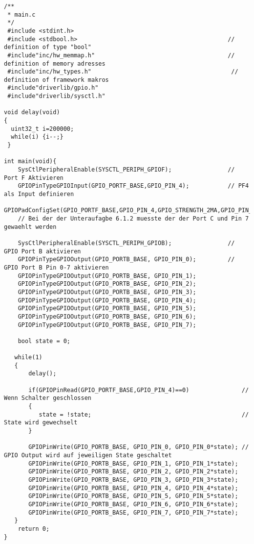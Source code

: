 \subsubsection{}

\begin{lstlisting}
/**
 * main.c
 */
 #include <stdint.h>
 #include <stdbool.h>                                           // definition of type "bool"
 #include"inc/hw_memmap.h"                                      // definition of memory adresses
 #include"inc/hw_types.h"                                        // definition of framework makros
 #include"driverlib/gpio.h"
 #include"driverlib/sysctl.h"

void delay(void)
{
  uint32_t i=200000;
  while(i) {i--;}
 }

int main(void){
    SysCtlPeripheralEnable(SYSCTL_PERIPH_GPIOF);                // Port F Aktivieren
    GPIOPinTypeGPIOInput(GPIO_PORTF_BASE,GPIO_PIN_4);           // PF4 als Input definieren
    GPIOPadConfigSet(GPIO_PORTF_BASE,GPIO_PIN_4,GPIO_STRENGTH_2MA,GPIO_PIN_TYPE_STD_WPU);
    // Bei der der Unteraufagbe 6.1.2 muesste der der Port C und Pin 7 gewaehlt werden

    SysCtlPeripheralEnable(SYSCTL_PERIPH_GPIOB);                // GPIO Port B aktivieren
    GPIOPinTypeGPIOOutput(GPIO_PORTB_BASE, GPIO_PIN_0);         // GPIO Port B Pin 0-7 aktivieren
    GPIOPinTypeGPIOOutput(GPIO_PORTB_BASE, GPIO_PIN_1);
    GPIOPinTypeGPIOOutput(GPIO_PORTB_BASE, GPIO_PIN_2);
    GPIOPinTypeGPIOOutput(GPIO_PORTB_BASE, GPIO_PIN_3);
    GPIOPinTypeGPIOOutput(GPIO_PORTB_BASE, GPIO_PIN_4);
    GPIOPinTypeGPIOOutput(GPIO_PORTB_BASE, GPIO_PIN_5);
    GPIOPinTypeGPIOOutput(GPIO_PORTB_BASE, GPIO_PIN_6);
    GPIOPinTypeGPIOOutput(GPIO_PORTB_BASE, GPIO_PIN_7);

    bool state = 0;

   while(1)
   {
       delay();

       if(GPIOPinRead(GPIO_PORTF_BASE,GPIO_PIN_4)==0)               // Wenn Schalter geschlossen
       {
          state = !state;                                           // State wird gewechselt
       }

       GPIOPinWrite(GPIO_PORTB_BASE, GPIO_PIN_0, GPIO_PIN_0*state); // GPIO Output wird auf jeweiligen State geschaltet
       GPIOPinWrite(GPIO_PORTB_BASE, GPIO_PIN_1, GPIO_PIN_1*state);
       GPIOPinWrite(GPIO_PORTB_BASE, GPIO_PIN_2, GPIO_PIN_2*state);
       GPIOPinWrite(GPIO_PORTB_BASE, GPIO_PIN_3, GPIO_PIN_3*state);
       GPIOPinWrite(GPIO_PORTB_BASE, GPIO_PIN_4, GPIO_PIN_4*state);
       GPIOPinWrite(GPIO_PORTB_BASE, GPIO_PIN_5, GPIO_PIN_5*state);
       GPIOPinWrite(GPIO_PORTB_BASE, GPIO_PIN_6, GPIO_PIN_6*state);
       GPIOPinWrite(GPIO_PORTB_BASE, GPIO_PIN_7, GPIO_PIN_7*state);
   }
    return 0;
}
\end{lstlisting}

